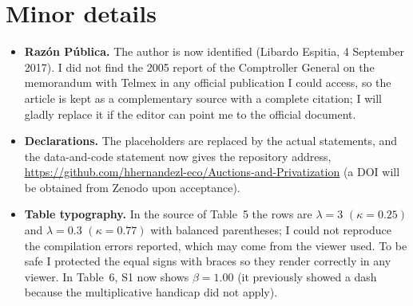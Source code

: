 \documentclass[11pt,a4paper]{article}
\begin{document}
\section*{Minor details}
\begin{itemize}
\item \textbf{Razón Pública.} The author is now identified (Libardo Espitia, 4 September 2017). I did not find the 2005 report of the Comptroller General on the memorandum with Telmex in any official publication I could access, so the article is kept as a complementary source with a complete citation; I will gladly replace it if the editor can point me to the official document.
\item \textbf{Declarations.} The placeholders are replaced by the actual statements, and the data-and-code statement now gives the repository address, \url{https://github.com/hhernandezl-eco/Auctions-and-Privatization} (a DOI will be obtained from Zenodo upon acceptance).
\item \textbf{Table typography.} In the source of Table~5 the rows are $\lambda=3$ $(\kappa=0.25)$ and $\lambda=0.3$ $(\kappa=0.77)$ with balanced parentheses; I could not reproduce the compilation errors reported, which may come from the viewer used. To be safe I protected the equal signs with braces so they render correctly in any viewer. In Table~6, S1 now shows $\beta=1.00$ (it previously showed a dash because the multiplicative handicap did not apply).
\end{itemize}
\end{document}
